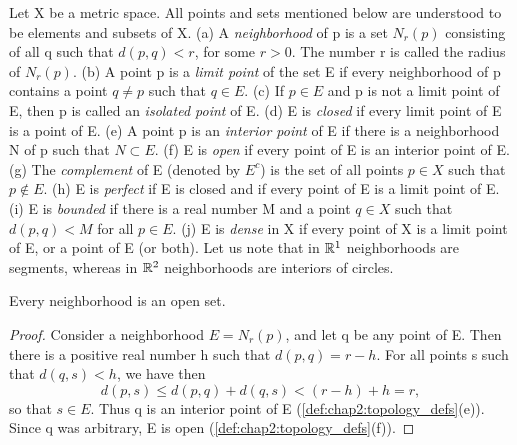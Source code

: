 \begin{definition} %
  \label{def:chap2:topology_defs}
  Let X be a metric space. All points and sets mentioned below are
  understood to be elements and subsets of X.
  (a) A \emph{neighborhood} of p is a set $N_r(p)$ consisting of all
  q such that $d(p, q) < r$, for some $r>0$. The number r is called
  the radius of $N_r(p)$. \label{def:chap2:neighborhood}
  (b) A point p is a \emph{limit point} of the set E if every
  neighborhood of p contains a point $q \ne p$ such that $q \in E$.
  \label{def:chap2:limit_point}
  (c) If $p \in E$ and p is not a limit point of E, then p is called
  an \emph{isolated point} of E. \label{def:chap2:isolated_point}
  (d) E is \emph{closed} if every limit point of E is a point of E.
  \label{def:chap2:closed_set}
  (e) A point p is an \emph{interior point} of E if there is a
  neighborhood N of p such that $N \subset E$. \label{def:chap2:interior_point}
  (f) E is \emph{open} if every point of E is an interior point of E.
  \label{def:chap2:open_set}
  (g) The \emph{complement} of E (denoted by $E^c$) is the set of all
  points $p \in X$ such that $p \notin E$. \label{def:chap2:complement}
  (h) E is \emph{perfect} if E is closed and if every point of E is a
  limit point of E. \label{def:chap2:perfect_set}
  (i) E is \emph{bounded} if there is a real number M and a point $q
  \in X$ such that $d(p, q) < M$ for all $p \in E$.
  \label{def:chap2:bounded_set}
  (j) E is \emph{dense} in X if every point of X is a limit point of
  E, or a point of E (or both). \label{def:chap2:dense_set}
  Let us note that in $\mathbb{R}^1$ neighborhoods are segments, whereas in
  $\mathbb{R}^2$ neighborhoods are interiors of circles.
\end{definition}

\begin{theorem} %
  \label{thm:chap2:neighborhood_open}
  Every neighborhood is an open set.
  \begin{proof}
    Consider a neighborhood $E = N_r(p)$, and let q be any point of
    E. Then there is a positive real number h such that $d(p, q) = r - h$.
    For all points s such that $d(q, s) < h$, we have then
    \[ d(p, s) \le d(p, q) + d(q, s) < (r-h) + h = r, \]
    so that $s \in E$. Thus q is an interior point of E
    (\autoref{def:chap2:topology_defs}(e)). Since q was arbitrary, E
    is open (\autoref{def:chap2:topology_defs}(f)).
  \end{proof}
\end{theorem}

